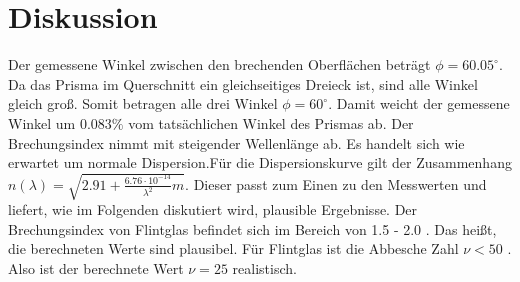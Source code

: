 \section{Diskussion}
\label{sec:Diskussion}

Der gemessene Winkel zwischen den brechenden Oberflächen beträgt $\phi=60.05^\circ$. Da das Prisma im Querschnitt ein gleichseitiges Dreieck ist, sind alle Winkel gleich groß. Somit betragen alle drei Winkel $\phi=60^\circ$. Damit weicht der gemessene Winkel um $0.083\%$ vom tatsächlichen Winkel des Prismas ab.
Der Brechungsindex nimmt mit steigender Wellenlänge ab. Es handelt sich wie erwartet um normale Dispersion.Für die Dispersionskurve gilt der Zusammenhang $n(\lambda) =\sqrt{2.91 + \frac{6.76\cdot10^{-14}}{\lambda^2}m}$. Dieser passt zum Einen zu den Messwerten und liefert, wie im Folgenden diskutiert wird, plausible Ergebnisse.   Der Brechungsindex von Flintglas befindet sich im Bereich von 1.5 - 2.0 \cite{chemie.de}. Das heißt, die berechneten Werte sind plausibel.
Für  Flintglas ist die Abbesche Zahl $\nu<50$ \cite{chemie.de}. Also ist der berechnete Wert  $\nu=25$ realistisch.

